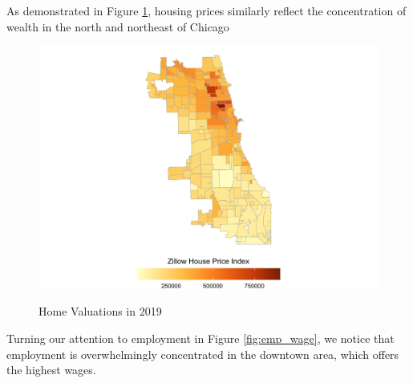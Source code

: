 \documentclass[12pt]{article}
\begin{document}
As demonstrated in Figure \ref{fig:housing_diag}, housing prices similarly reflect the concentration of wealth in the north and northeast of Chicago
\begin{figure}[h!]
    \centering
    \caption{Home Valuations in 2019}
    \includegraphics[width=\linewidth]{Pset1/code/lodes_diagnostics_files/figure-html/fig-houseprices-1.png}
    \label{fig:housing_diag}
\end{figure}
Turning our attention to employment in Figure \ref{fig:emp_wage}, we notice that employment is overwhelmingly concentrated in the downtown area, which offers the highest wages. 
\end{document}
